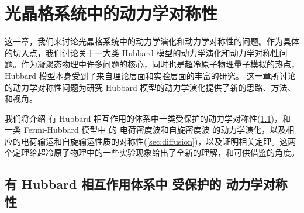 \chapter{光晶格系统中的动力学对称性} \label{chap:dynm}

这一章，我们来讨论光晶格系统中的动力学演化和动力学对称性的问题。作为具体的切入点，我们讨论关于一大类 Hubbard 模型的动力学演化和动力学对称性问题。作为凝聚态物理中许多问题的核心，同时也是超冷原子物理量子模拟的热点，Hubbard 模型本身受到了来自理论层面和实验层面的丰富的研究。 
这一章所讨论的动力学对称性问题为研究 Hubbard 模型的动力学演化提供了新的思路、方法、和视角。

我们将介绍 有 Hubbard 相互作用的体系中一类受保护的动力学对称性(\ref{sec:dynsymm})，和 一类 Fermi-Hubbard 模型中 的 电荷密度波和自旋密度波 的动力学演化，以及相应的电荷输运和自旋输运性质的对称性(\ref{sec:diffusion})，以及证明相关定理。这两个定理给超冷原子物理中的一些实验现象\cite{hubbard-expan-2010,hubbard-expan-2012,mbl1d,twobody-2017,charge-diffusion,spin-diffusion}给出了全新的理解，和可供借鉴的角度。



\section{有 Hubbard 相互作用体系中 受保护的 动力学对称性}\label{sec:dynsymm}


